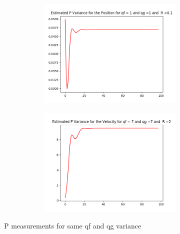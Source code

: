 \documentclass{article}
\begin{document}
        \begin{figure}[H]
            \centering 
            \begin{subfigure}{1\textwidth}  
                \begin{subfigure}{.5\textwidth} 
                    \centering  
                    \includegraphics[width=.7\linewidth]{./img/acc/P11_qf1_qg1_r01.png}
                    \caption{ }
                \end{subfigure}
                \begin{subfigure}{.5\textwidth}  
                    \centering 
                    \includegraphics[width=.7\linewidth]{./img/acc/P22_qf7_qg7_r2.png}
                    \caption{}
                \end{subfigure}
            \end{subfigure}
            \caption{P measurements for same qf and qg variance}
            \label{fig:accmatp}
        \end{figure}
\end{document}
